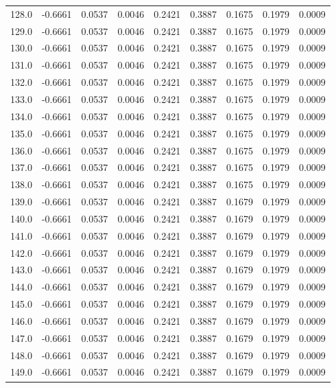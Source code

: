 \begin{longtable}{lrrrrrrrr}
128.0 & -0.6661 & 0.0537 & 0.0046 & 0.2421 & 0.3887 & 0.1675 & 0.1979 & 0.0009 \\
129.0 & -0.6661 & 0.0537 & 0.0046 & 0.2421 & 0.3887 & 0.1675 & 0.1979 & 0.0009 \\
130.0 & -0.6661 & 0.0537 & 0.0046 & 0.2421 & 0.3887 & 0.1675 & 0.1979 & 0.0009 \\
131.0 & -0.6661 & 0.0537 & 0.0046 & 0.2421 & 0.3887 & 0.1675 & 0.1979 & 0.0009 \\
132.0 & -0.6661 & 0.0537 & 0.0046 & 0.2421 & 0.3887 & 0.1675 & 0.1979 & 0.0009 \\
133.0 & -0.6661 & 0.0537 & 0.0046 & 0.2421 & 0.3887 & 0.1675 & 0.1979 & 0.0009 \\
134.0 & -0.6661 & 0.0537 & 0.0046 & 0.2421 & 0.3887 & 0.1675 & 0.1979 & 0.0009 \\
135.0 & -0.6661 & 0.0537 & 0.0046 & 0.2421 & 0.3887 & 0.1675 & 0.1979 & 0.0009 \\
136.0 & -0.6661 & 0.0537 & 0.0046 & 0.2421 & 0.3887 & 0.1675 & 0.1979 & 0.0009 \\
137.0 & -0.6661 & 0.0537 & 0.0046 & 0.2421 & 0.3887 & 0.1675 & 0.1979 & 0.0009 \\
138.0 & -0.6661 & 0.0537 & 0.0046 & 0.2421 & 0.3887 & 0.1675 & 0.1979 & 0.0009 \\
139.0 & -0.6661 & 0.0537 & 0.0046 & 0.2421 & 0.3887 & 0.1679 & 0.1979 & 0.0009 \\
140.0 & -0.6661 & 0.0537 & 0.0046 & 0.2421 & 0.3887 & 0.1679 & 0.1979 & 0.0009 \\
141.0 & -0.6661 & 0.0537 & 0.0046 & 0.2421 & 0.3887 & 0.1679 & 0.1979 & 0.0009 \\
142.0 & -0.6661 & 0.0537 & 0.0046 & 0.2421 & 0.3887 & 0.1679 & 0.1979 & 0.0009 \\
143.0 & -0.6661 & 0.0537 & 0.0046 & 0.2421 & 0.3887 & 0.1679 & 0.1979 & 0.0009 \\
144.0 & -0.6661 & 0.0537 & 0.0046 & 0.2421 & 0.3887 & 0.1679 & 0.1979 & 0.0009 \\
145.0 & -0.6661 & 0.0537 & 0.0046 & 0.2421 & 0.3887 & 0.1679 & 0.1979 & 0.0009 \\
146.0 & -0.6661 & 0.0537 & 0.0046 & 0.2421 & 0.3887 & 0.1679 & 0.1979 & 0.0009 \\
147.0 & -0.6661 & 0.0537 & 0.0046 & 0.2421 & 0.3887 & 0.1679 & 0.1979 & 0.0009 \\
148.0 & -0.6661 & 0.0537 & 0.0046 & 0.2421 & 0.3887 & 0.1679 & 0.1979 & 0.0009 \\
149.0 & -0.6661 & 0.0537 & 0.0046 & 0.2421 & 0.3887 & 0.1679 & 0.1979 & 0.0009 \\

\end{longtable}
